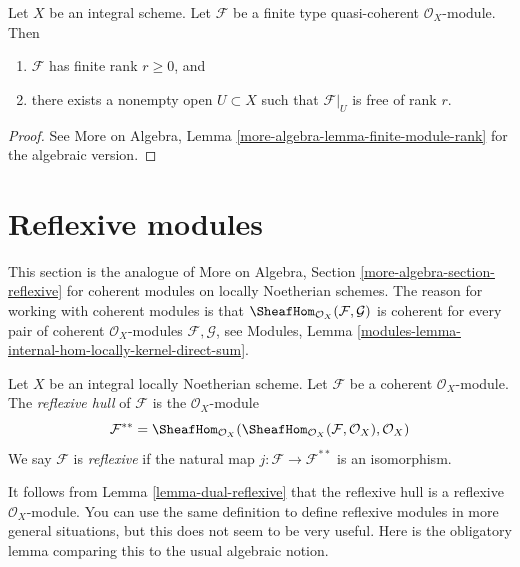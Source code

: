 \begin{lemma}
\label{lemma-finite-module-rank}
Let $X$ be an integral scheme. Let $\mathcal{F}$ be a finite type
quasi-coherent $\mathcal{O}_X$-module. Then
\begin{enumerate}
\item $\mathcal{F}$ has finite rank $r \geq 0$, and
\item there exists a nonempty open $U \subset X$
such that $\mathcal{F}|_U$ is free of rank $r$.
\end{enumerate}
\end{lemma}

\begin{proof}
See More on Algebra, Lemma \ref{more-algebra-lemma-finite-module-rank}
for the algebraic version.
\end{proof}











\section{Reflexive modules}
\label{section-reflexive}

\noindent
This section is the analogue of
More on Algebra, Section \ref{more-algebra-section-reflexive}
for coherent modules on locally Noetherian schemes. The reason for
working with coherent modules is that
$\SheafHom_{\mathcal{O}_X}(\mathcal{F}, \mathcal{G})$ is coherent
for every pair of coherent $\mathcal{O}_X$-modules $\mathcal{F}, \mathcal{G}$,
see Modules, Lemma \ref{modules-lemma-internal-hom-locally-kernel-direct-sum}.

\begin{definition}
\label{definition-reflexive}
Let $X$ be an integral locally Noetherian scheme. Let $\mathcal{F}$
be a coherent $\mathcal{O}_X$-module. The {\it reflexive hull}
of $\mathcal{F}$ is the $\mathcal{O}_X$-module
$$
\mathcal{F}^{**} = \SheafHom_{\mathcal{O}_X}(
\SheafHom_{\mathcal{O}_X}(\mathcal{F}, \mathcal{O}_X), \mathcal{O}_X)
$$
We say $\mathcal{F}$ is {\it reflexive} if the natural map
$j : \mathcal{F} \longrightarrow \mathcal{F}^{**}$
is an isomorphism.
\end{definition}

\noindent
It follows from Lemma \ref{lemma-dual-reflexive} that the reflexive hull
is a reflexive $\mathcal{O}_X$-module.
You can use the same definition to define reflexive modules in more
general situations, but this does not seem to be very useful.
Here is the obligatory lemma comparing this to the usual algebraic notion.

